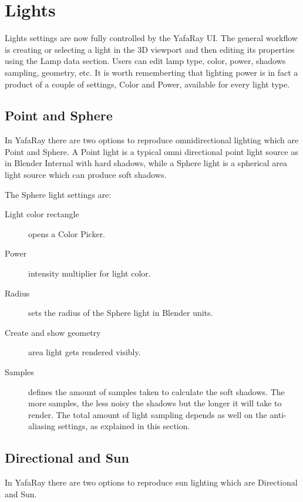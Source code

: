\section{Lights} \label{sec:lights}

Lights settings are now fully controlled by the YafaRay UI. The general workflow is creating or selecting a light in the 3D viewport and then editing its properties using the Lamp data section. Users can edit lamp type, color, power, shadows sampling, geometry, etc. It is worth rememberting that lighting power is in fact a product of a couple of settings, Color and Power, available for every light type.

\subsection{Point and Sphere}

In YafaRay there are two options to reproduce omnidirectional lighting which are Point and Sphere. A Point light is a typical omni directional point light source as in Blender Internal with hard shadows, while a Sphere light is a spherical area light source which can produce soft shadows.

The Sphere light settings are:
\begin{description}
\item[Light color rectangle] opens a Color Picker.
\item[Power] intensity multiplier for light color.
\item[Radius] sets the radius of the Sphere light in Blender units.
\item[Create and show geometry] area light gets rendered visibly.
\item[Samples] defines the amount of samples taken to calculate the soft shadows. The more samples, the less noisy the shadows but the longer it will take to render. The total amount of light sampling depends as well on the anti-aliasing settings, as explained in this section.
\end{description}


\subsection{Directional and Sun}

In YafaRay there are two options to reproduce sun lighting which are Directional and Sun.

